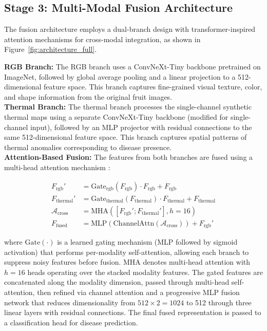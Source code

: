 \documentclass[utf8]{FrontiersinHarvard} %
\begin{document}
\subsection{Stage 3: Multi-Modal Fusion Architecture}
The fusion architecture employs a dual-branch design with transformer-inspired attention mechanisms for cross-modal integration, as shown in Figure~\ref{fig:architecture_full}.

\textbf{RGB Branch:} The RGB branch uses a ConvNeXt-Tiny \cite{liu2022convnext} backbone pretrained on ImageNet, followed by global average pooling and a linear projection to a 512-dimensional feature space. This branch captures fine-grained visual texture, color, and shape information from the original fruit images.\\

\textbf{Thermal Branch:} The thermal branch processes the single-channel synthetic thermal maps using a separate ConvNeXt-Tiny backbone \cite{liu2022convnext} (modified for single-channel input), followed by an MLP projector with residual connections to the same 512-dimensional feature space. This branch captures spatial patterns of thermal anomalies corresponding to disease presence.\\

\textbf{Attention-Based Fusion:} The features from both branches are fused using a multi-head attention mechanism \cite{vaswani2017,guo2022}:

\begin{align}
    F_{\text{rgb}}' &= \text{Gate}_{\text{rgb}}(F_{\text{rgb}}) \cdot F_{\text{rgb}} + F_{\text{rgb}} \label{eq:gate_rgb} \\
    F_{\text{thermal}}' &= \text{Gate}_{\text{thermal}}(F_{\text{thermal}}) \cdot F_{\text{thermal}} + F_{\text{thermal}} \label{eq:gate_thermal} \\
    \mathcal{A}_{\text{cross}} &= \text{MHA}([F_{\text{rgb}}'; F_{\text{thermal}}'], h{=}16) \label{eq:mha} \\
    F_{\text{fused}} &= \text{MLP}(\text{ChannelAttn}(\mathcal{A}_{\text{cross}})) + F_{\text{rgb}}' \label{eq:fused}
\end{align}

where $\text{Gate}(\cdot)$ is a learned gating mechanism (MLP followed by sigmoid activation) that performs per-modality self-attention, allowing each branch to suppress noisy features before fusion. MHA denotes multi-head attention with $h=16$ heads operating over the stacked modality features. The gated features are concatenated along the modality dimension, passed through multi-head self-attention, then refined via channel attention and a progressive MLP fusion network that reduces dimensionality from $512 \times 2 = 1024$ to 512 through three linear layers with residual connections. The final fused representation is passed to a classification head for disease prediction.\\
\end{document}
